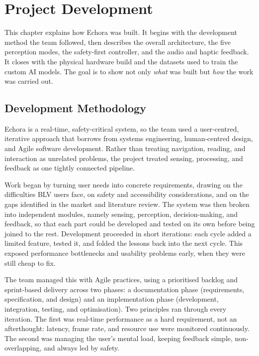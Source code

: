 \chapter{Project Development}
\label{ch:dev}

This chapter explains how Echora was built. It begins with the development method the team followed, then describes the overall architecture, the five perception modes, the safety-first controller, and the audio and haptic feedback. It closes with the physical hardware build and the datasets used to train the custom AI models. The goal is to show not only \emph{what} was built but \emph{how} the work was carried out.

\section{Development Methodology}

Echora is a real-time, safety-critical system, so the team used a user-centred, iterative approach that borrows from systems engineering, human-centred design, and Agile software development. Rather than treating navigation, reading, and interaction as unrelated problems, the project treated sensing, processing, and feedback as one tightly connected pipeline.

Work began by turning user needs into concrete requirements, drawing on the difficulties BLV users face, on safety and accessibility considerations, and on the gaps identified in the market and literature review. The system was then broken into independent modules, namely sensing, perception, decision-making, and feedback, so that each part could be developed and tested on its own before being joined to the rest. Development proceeded in short iterations: each cycle added a limited feature, tested it, and folded the lessons back into the next cycle. This exposed performance bottlenecks and usability problems early, when they were still cheap to fix.

The team managed this with Agile practices, using a prioritised backlog and sprint-based delivery across two phases: a documentation phase (requirements, specification, and design) and an implementation phase (development, integration, testing, and optimisation). Two principles ran through every iteration. The first was real-time performance as a hard requirement, not an afterthought: latency, frame rate, and resource use were monitored continuously. The second was managing the user's mental load, keeping feedback simple, non-overlapping, and always led by safety.

